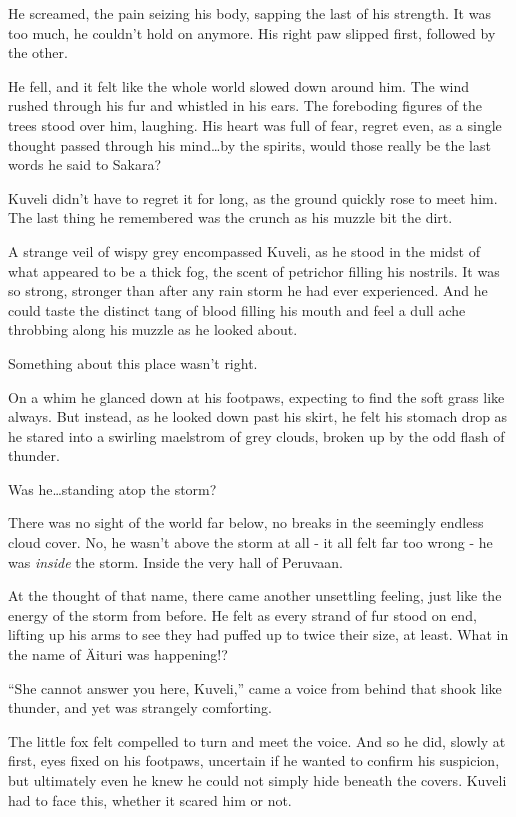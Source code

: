 He screamed, the pain seizing his body, sapping the last of his strength. It was too much, he couldn't hold on anymore. His right paw slipped first, followed by the other.

He fell, and it felt like the whole world slowed down around him. The wind rushed through his fur and whistled in his ears. The foreboding figures of the trees stood over him, laughing. His heart was full of fear, regret even, as a single thought passed through his mind\ldots{}by the spirits, would those really be the last words he said to Sakara?

Kuveli didn't have to regret it for long, as the ground quickly rose to meet him. The last thing he remembered was the crunch as his muzzle bit the dirt.

\secdiv

\noindent A strange veil of wispy grey encompassed Kuveli, as he stood in the midst of what appeared to be a thick fog, the scent of petrichor filling his nostrils. It was so strong, stronger than after any rain storm he had ever experienced. And he could taste the distinct tang of blood filling his mouth and feel a dull ache throbbing along his muzzle as he looked about.

Something about this place wasn't right.

On a whim he glanced down at his footpaws, expecting to find the soft grass like always. But instead, as he looked down past his skirt, he felt his stomach drop as he stared into a swirling maelstrom of grey clouds, broken up by the odd flash of thunder.

Was he\ldots{}standing atop the storm?

There was no sight of the world far below, no breaks in the seemingly endless cloud cover. No, he wasn't above the storm at all - it all felt far too wrong - he was \emph{inside} the storm. Inside the very hall of Peruvaan.

At the thought of that name, there came another unsettling feeling, just like the energy of the storm from before. He felt as every strand of fur stood on end, lifting up his arms to see they had puffed up to twice their size, at least. What in the name of Äituri was happening!?

``She cannot answer you here, Kuveli,'' came a voice from behind that shook like thunder, and yet was strangely comforting.

The little fox felt compelled to turn and meet the voice. And so he did, slowly at first, eyes fixed on his footpaws, uncertain if he wanted to confirm his suspicion, but ultimately even he knew he could not simply hide beneath the covers. Kuveli had to face this, whether it scared him or not.

